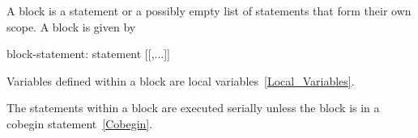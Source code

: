 
A block is a statement or a possibly empty list of statements that
form their own scope.  A block is given by
\begin{syntax}
block-statement:
  { statement [[,...]] }
  { }
\end{syntax}

Variables defined within a block are local
variables~\ref{Local_Variables}.

The statements within a block are executed serially unless the block
is in a cobegin statement~\ref{Cobegin}.
